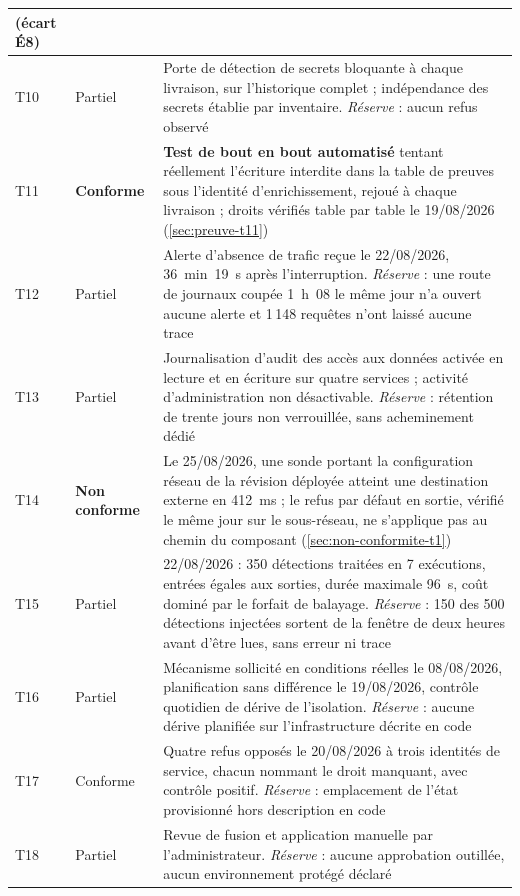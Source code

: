 {\begin{longtable}{|P{0.8cm}|P{1.55cm}|P{12.9cm}|}
(écart É8) \\ \hline
T10 & Partiel & Porte de détection de secrets bloquante à chaque livraison, sur
l'historique complet ; indépendance des secrets établie par inventaire. \emph{Réserve} : aucun
refus observé \\ \hline
T11 & \textbf{Conforme} & \textbf{Test de bout en bout automatisé} tentant réellement
l'écriture interdite dans la table de preuves sous l'identité d'enrichissement, rejoué à chaque
livraison ; droits vérifiés table par table le 19/08/2026 (\cref{sec:preuve-t11}) \\ \hline
T12 & Partiel & Alerte d'absence de trafic reçue le 22/08/2026, 36~min~19~s après
l'interruption. \emph{Réserve} : une route de journaux coupée 1~h~08 le même jour n'a ouvert aucune
alerte et 1\,148 requêtes n'ont laissé aucune trace \\ \hline
T13 & Partiel & Journalisation d'audit des accès aux données activée en lecture et en
écriture sur quatre services ; activité d'administration non désactivable. \emph{Réserve} :
rétention de trente jours non verrouillée, sans acheminement dédié \\ \hline
T14 & \textbf{Non conforme} & Le 25/08/2026, une sonde portant la configuration réseau de la
révision déployée atteint une destination externe en 412~ms ; le refus par défaut en sortie,
vérifié le même jour sur le sous-réseau, ne s'applique pas au chemin du composant
(\cref{sec:non-conformite-t1}) \\ \hline
T15 & Partiel & 22/08/2026 : 350 détections traitées en 7 exécutions, entrées égales aux
sorties, durée maximale 96~s, coût dominé par le forfait de balayage. \emph{Réserve} : 150 des 500
détections injectées sortent de la fenêtre de deux heures avant d'être lues, sans erreur ni
trace \\ \hline
T16 & Partiel & Mécanisme sollicité en conditions réelles le 08/08/2026, planification sans
différence le 19/08/2026, contrôle quotidien de dérive de l'isolation. \emph{Réserve} : aucune
dérive planifiée sur l'infrastructure décrite en code \\ \hline
T17 & Conforme & Quatre refus opposés le 20/08/2026 à trois identités de service, chacun
nommant le droit manquant, avec contrôle positif. \emph{Réserve} : emplacement de l'état
provisionné hors description en code \\ \hline
T18 & Partiel & Revue de fusion et application manuelle par l'administrateur.
\emph{Réserve} : aucune approbation outillée, aucun environnement protégé déclaré \\ \hline

\end{longtable}}
